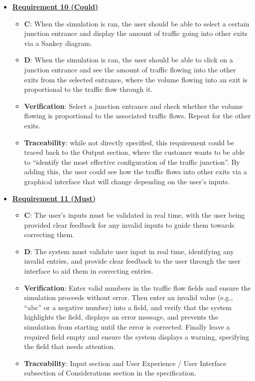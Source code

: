 \documentclass{article}
\begin{document}
\begin{itemize}
    \item \textbf{\underline{Requirement 10 (Could)}}
    \begin{itemize}
        \item \textbf{C}: When the simulation is ran, the user should be able to select a certain junction entrance 
            and display the amount of traffic going into other exits via a 
            Sankey diagram.
        \item \textbf{D}: When the simulation is ran, the user should be able to click on a junction entrance and see 
            the amount of traffic flowing into the other exits from the selected entrance, where the volume 
            flowing into an exit is proportional to the traffic flow through it.
        \item \textbf{Verification}: Select a junction entrance and check whether the volume flowing
            is proportional to the associated traffic flows. Repeat for the other exits.
        \item\textbf{Traceability}: while not directly specified, this requirement could be traced back 
            to the Output section, where the customer wants to be able to “identify the most effective 
            configuration of the traffic junction”. By adding this, the user could see how the traffic 
            flows into other exits via a graphical interface that will change depending on the user's 
            inputs.
    \end{itemize}

    \item \textbf{\underline{Requirement 11 (Must)}}
    \begin{itemize}
        \item \textbf{C}: The user's inputs must be validated in real time, with the user being provided clear 
        feedback for any invalid inputs to guide them towards correcting them.
        \item \textbf{D}: The system must validate user input in real time, identifying any invalid entries, 
        and provide clear feedback to the user through the user interface to aid them in correcting entries.
        \item \textbf{Verification}: Enter valid numbers in the traffic flow fields and ensure the 
        simulation proceeds without error. Then enter an invalid value (e.g., “abc” or a negative number) into 
        a field, and verify that the system highlights the field, displays an error message, and prevents the 
        simulation from starting until the error is corrected. Finally leave a required field empty and ensure 
        the system displays a warning, specifying the field that needs attention.
        \item\textbf{Traceability}: Input section and User Experience / User Interface subsection of 
        Considerations section in the specification.
    \end{itemize}


\end{itemize}
\end{document}
